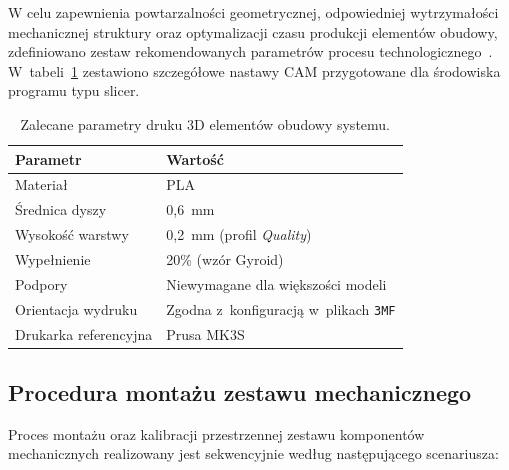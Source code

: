 \documentclass[a4paper,12pt,reqno]{article}
\begin{document}
W celu zapewnienia powtarzalności geometrycznej, odpowiedniej wytrzymałości mechanicznej struktury oraz optymalizacji czasu produkcji elementów obudowy, zdefiniowano zestaw rekomendowanych parametrów procesu technologicznego~\cite{gibson2021}. W~tabeli~\ref{tab:print_parameters} zestawiono szczegółowe nastawy CAM przygotowane dla środowiska programu typu slicer.

\begin{table}[H]
	\centering
	\caption{Zalecane parametry druku 3D elementów obudowy systemu.}
	\label{tab:print_parameters}
	\begin{tabular}{lp{8cm}}
		\toprule
		\textbf{Parametr} & \textbf{Wartość} \\
		\midrule
		
		Materiał & PLA \\
		
		Średnica dyszy & 0{,}6~mm \\
		
		Wysokość warstwy & 0{,}2~mm (profil \textit{Quality}) \\
		
		Wypełnienie & 20\% (wzór Gyroid) \\
		
		Podpory & Niewymagane dla większości modeli \\
		
		Orientacja wydruku & Zgodna z~konfiguracją w~plikach \texttt{3MF} \\
		
		Drukarka referencyjna & Prusa MK3S \\
		
		\bottomrule
	\end{tabular}
\end{table}

\subsection{Procedura montażu zestawu mechanicznego}

Proces montażu oraz kalibracji przestrzennej zestawu komponentów mechanicznych realizowany jest sekwencyjnie według następującego scenariusza:
\end{document}
